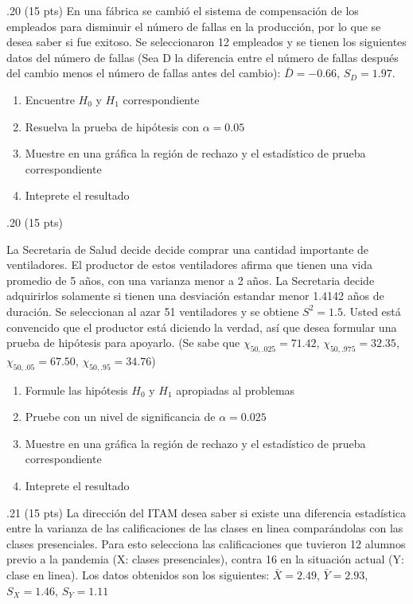 \documentclass[addpoints]{exam}
\theoremstyle{mytheor}
\begin{document}
\begin{questions} 

.20 (15 pts) En una fábrica se cambió el sistema de compensación de los empleados para disminuir el número de fallas en la producción, por lo que se desea saber si fue exitoso. Se seleccionaron 12 empleados y se tienen los siguientes datos del número de fallas (Sea D la diferencia entre el número de fallas después del cambio menos el número de fallas antes del cambio): $\bar{D} = -0.66$, $S_D = 1.97$.

\begin{enumerate}
\item Encuentre $H_0$ y $H_1$ correspondiente
\item Resuelva la prueba de hipótesis con $\alpha=0.05$
\item Muestre en una gráfica la región de rechazo y el estadístico de prueba correspondiente
\item Inteprete el resultado
\end{enumerate}


.20 (15 pts)

La Secretaria de Salud decide decide comprar una cantidad importante de ventiladores. El productor de estos ventiladores afirma que tienen una vida promedio de 5 años, con una varianza menor a 2 años. La Secretaria decide adquirirlos solamente si tienen una desviación estandar menor 1.4142 años de duración. Se seleccionan al azar 51 ventiladores y se obtiene $S^2 = 1.5$. Usted está convencido que el productor está diciendo la verdad, así que desea formular una prueba de hipótesis para apoyarlo. (Se sabe que $\chi_{50,.025} = 71.42$, $\chi_{50,.975} = 32.35$, $\chi_{50,.05} = 67.50$, $\chi_{50,.95} =34.76 $)

\begin{enumerate}
\item Formule las hipótesis $H_0$ y $H_1$ apropiadas al problemas
\item Pruebe con un nivel de significancia de $\alpha = 0.025$
\item Muestre en una gráfica la región de rechazo y el estadístico de prueba correspondiente
\item Inteprete el resultado
\end{enumerate}

.21 (15 pts)
La dirección del ITAM desea saber si existe una diferencia estadística entre la varianza de las calificaciones de las clases en linea comparándolas con las clases presenciales. Para esto selecciona las calificaciones que tuvieron 12 alumnos previo a la pandemia (X: clases presenciales), contra 16 en la situación actual (Y: clase en linea). Los datos obtenidos son los siguientes: $\bar{X} = 2.49$, $\bar{Y} = 2.93$, $S_{X} = 1.46$, $S_{Y} = 1.11$


\end{questions}
\end{document}
